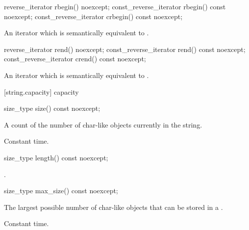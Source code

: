 %
%
\begin{itemdecl}
reverse_iterator       rbegin() noexcept;
const_reverse_iterator rbegin() const noexcept;
const_reverse_iterator crbegin() const noexcept;
\end{itemdecl}

\begin{itemdescr}
\pnum
\returns
An iterator which is semantically equivalent to
.
\end{itemdescr}

%
%
\begin{itemdecl}
reverse_iterator       rend() noexcept;
const_reverse_iterator rend() const noexcept;
const_reverse_iterator crend() const noexcept;
\end{itemdecl}

\begin{itemdescr}
\pnum
\returns
An iterator which is semantically equivalent to
.
\end{itemdescr}

[string.capacity]{ capacity}

%
\begin{itemdecl}
size_type size() const noexcept;
\end{itemdecl}

\begin{itemdescr}
\pnum
\returns
A count of the number of char-like objects currently in the string.

\pnum
\complexity Constant time.
\end{itemdescr}

%
\begin{itemdecl}
size_type length() const noexcept;
\end{itemdecl}

\begin{itemdescr}
\pnum
\returns
{}.
\end{itemdescr}

%
\begin{itemdecl}
size_type max_size() const noexcept;
\end{itemdecl}

\begin{itemdescr}
\pnum
\returns
The largest possible number of char-like objects that can be stored in a
.

\pnum
\complexity Constant time.
\end{itemdescr}

